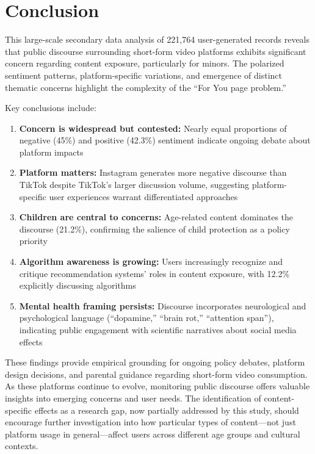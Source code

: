 \documentclass[12pt,a4paper]{article}
\begin{document}
\section{Conclusion}

This large-scale secondary data analysis of 221,764 user-generated records reveals that public discourse surrounding short-form video platforms exhibits significant concern regarding content exposure, particularly for minors. The polarized sentiment patterns, platform-specific variations, and emergence of distinct thematic concerns highlight the complexity of the ``For You page problem.''

Key conclusions include:

\begin{enumerate}[leftmargin=*, itemsep=0.5em]
    \item \textbf{Concern is widespread but contested:} Nearly equal proportions of negative (45\%) and positive (42.3\%) sentiment indicate ongoing debate about platform impacts

    \item \textbf{Platform matters:} Instagram generates more negative discourse than TikTok despite TikTok's larger discussion volume, suggesting platform-specific user experiences warrant differentiated approaches

    \item \textbf{Children are central to concerns:} Age-related content dominates the discourse (21.2\%), confirming the salience of child protection as a policy priority

    \item \textbf{Algorithm awareness is growing:} Users increasingly recognize and critique recommendation systems' roles in content exposure, with 12.2\% explicitly discussing algorithms

    \item \textbf{Mental health framing persists:} Discourse incorporates neurological and psychological language (``dopamine,'' ``brain rot,'' ``attention span''), indicating public engagement with scientific narratives about social media effects
\end{enumerate}

These findings provide empirical grounding for ongoing policy debates, platform design decisions, and parental guidance regarding short-form video consumption. As these platforms continue to evolve, monitoring public discourse offers valuable insights into emerging concerns and user needs. The identification of content-specific effects as a research gap, now partially addressed by this study, should encourage further investigation into how particular types of content---not just platform usage in general---affect users across different age groups and cultural contexts.
\end{document}
